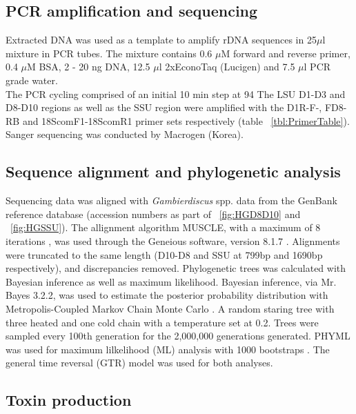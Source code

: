 \documentclass[12pt]{article}
\begin{document}
\subsection{PCR amplification and sequencing}
Extracted DNA was used as a template to amplify rDNA sequences in 25$\mu$l mixture in PCR tubes. The mixture contains 0.6 $\mu$M forward and reverse primer, 0.4 $\mu$M BSA, 2 - 20 ng DNA, 12.5 $\mu$l 2xEconoTaq (Lucigen) and 7.5 $\mu$l PCR grade water.\\
The PCR cycling comprised of an initial 10 min step at 94
The LSU D1-D3  and D8-D10 regions as well as the SSU region were amplified with the D1R-F-, FD8-RB and 18ScomF1-18ScomR1 primer sets respectively (table ~\ref{tbl:PrimerTable}).\\
Sanger sequencing was conducted by Macrogen (Korea).


\subsection{Sequence alignment and phylogenetic analysis}
Sequencing data was aligned with \emph{Gambierdiscus} spp. data from the GenBank reference database (accession numbers as part of ~\ref{fig:HGD8D10} and ~\ref{fig:HGSSU}). The allignment algorithm MUSCLE, with a maximum of 8 iterations \cite{edgar2004muscle}, was used through the Geneious software, version 8.1.7 \cite{kearse2012geneious}. Alignments were truncated to the same length (D10-D8 and SSU at 799bp and 1690bp respectively), and discrepancies removed.
Phylogenetic trees was calculated with Bayesian inference as well as maximum likelihood. Bayesian inference, via Mr. Bayes 3.2.2, was used to estimate the posterior probability distribution with Metropolis-Coupled Markov Chain Monte Carlo \cite{ronquist2003mrbayes}. A random staring tree with three heated and one cold chain with a temperature set at 0.2. Trees were sampled every 100th generation for the 2,000,000 generations generated.
PHYML was used for maximum lilkelihood (ML) analysis with 1000 bootstraps \cite{guindon2003simple}.
The general time reversal (GTR) model was used for both analyses.\\

\subsection{Toxin production}
\end{document}
